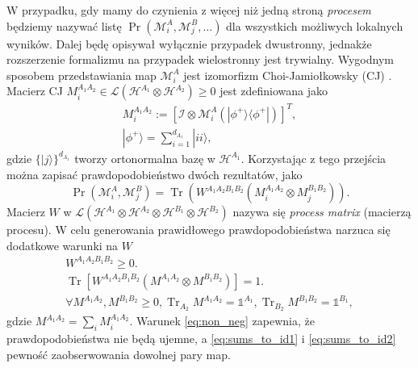 \documentclass[10pt]{article} %
\DeclareMathOperator{\Trs}{Tr}
\newcommand{\Mats}[1]{\mathcal{L}(#1)}
\newcommand{\Hx}[1]{\mathcal{H}^{#1}}
\newcommand{\HAi}{\Hx{A_1}}
\newcommand{\MXi}[3]{\mathcal{M}^{#1}_{#2}(#3)}
\newcommand{\MXin}[2]{\mathcal{M}^{#1}_{#2}}
\newcommand{\MAin}[0]{\MXin{A}{i}}
\newcommand{\MAi}[1]{\MXi{A}{i}{#1}}
\newcommand{\Tr}[1]{\Trs(#1)}
\newcommand{\Prt}[2]{\Pr(#1, #2)}
\newcommand{\Ket}[1]{|#1\rangle}
\newcommand{\Bra}[1]{\langle#1|}
\newcommand{\WAll}{W^{A_1A_2B_1B_2}}
\newcommand{\MA}{M^{A_1A_2}}
\newcommand{\MB}{M^{B_1B_2}}
\newcommand{\mai}[1]{\MA_{#1}}
\begin{document}
W przypadku, gdy mamy do czynienia z więcej niż jedną stroną \textit{procesem} będziemy nazywać listę $\Pr(\MXin{A}{i}, \MXin{B}{j}, \dots)$ dla wszystkich możliwych lokalnych wyników. Dalej będę opisywał wyłącznie przypadek dwustronny, jednakże rozszerzenie formalizmu na przypadek wielostronny jest trywialny. Wygodnym sposobem przedstawiania map $\MAin$ jest izomorfizm Choi-Jamiołkowsky (CJ) \cite{cj_iso1, cj_iso2}. Macierz CJ $M^{A_1A_2}_i \in \Mats{\Hx{A_1} \otimes \Hx{A_2}} \geq 0$ jest zdefiniowana jako
\begin{gather}
\label{eq:cj_iso}
M^{A_1A_2}_i := [\mathcal{I} \otimes \MAi{ \Ket{\phi^+} \Bra{\phi^+}}]^T, \\
\Ket{\phi^+} = \sum^{d_{A_1}}_{i=1} \Ket{ii},
\end{gather}
gdzie $\{\Ket{j}\}^{d_{A_1}}$ tworzy ortonormalna bazę w $\HAi$. Korzystając z tego przejścia można zapisać prawdopodobieństwo dwóch rezultatów, jako 
\begin{equation}
\label{eq:cj_prob}
\Prt{\MAin}{\MXin{B}{j}} = \Tr{\WAll(M^{A_1A_2}_i \otimes M^{B_1B_2}_j)}.
\end{equation}
Macierz $W$ w $\Mats{\Hx{A_1} \otimes \Hx{A_2} \otimes \Hx{B_1} \otimes \Hx{B_2}}$ nazywa się \textit{process matrix} (macierzą procesu).
W celu generowania prawidłowego prawdopodobieństwa narzuca się dodatkowe warunki na $W$
\begin{gather}
\label{eq:non_neg}
\WAll \geq 0. \\
\label{eq:sums_to_id1}
\Trs
\left[
\WAll
\left(
M^{A_1A_2} \otimes M^{B_1B_2}
\right)
\right]=1.\\
\label{eq:sums_to_id2}
\forall M^{A_1A_2}, M^{B_1B_2} \geq 0, \Trs_{A_2} \MA = \mathbb{1}^{A_1}, \Trs_{B_2} \MB = \mathbb{1}^{B_1},
\end{gather}
gdzie $\MA = \sum_i \mai{i}$. Warunek \eqref{eq:non_neg} zapewnia, że prawdopodobieństwa nie będą ujemne, a \eqref{eq:sums_to_id1} i  \eqref{eq:sums_to_id2} pewność zaobserwowania dowolnej pary map. 
\end{document}
